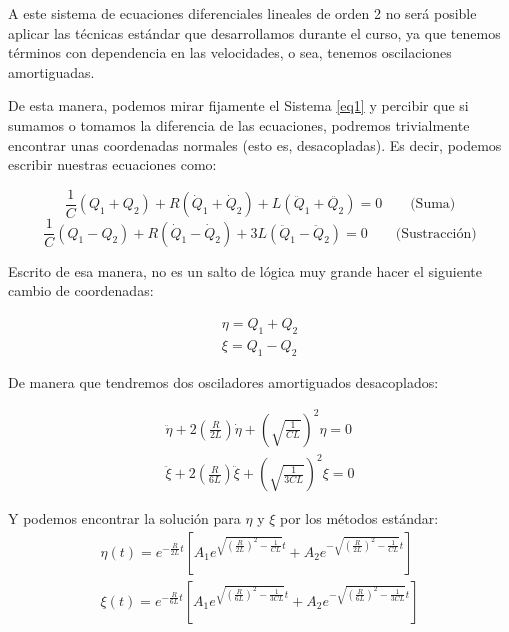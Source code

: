 \documentclass[a4paper,12pt]{article}
\begin{document}
A este sistema de ecuaciones diferenciales lineales de orden 2 no será posible aplicar las técnicas estándar que desarrollamos durante el curso, ya que tenemos términos con dependencia en las velocidades, o sea, tenemos oscilaciones amortiguadas.

De esta manera, podemos mirar fijamente el Sistema \eqref{eq1} y percibir que si sumamos o tomamos la diferencia de las ecuaciones, podremos trivialmente encontrar unas coordenadas normales (esto es, desacopladas). Es decir, podemos escribir nuestras ecuaciones como:

$$ \frac{1}{C} (Q_1 + Q_2) + R (\dot{Q}_1 + \dot{Q}_2)  + L (\ddot{Q}_1 + \ddot{Q_2})=0 \qquad \text{(Suma)}$$
$$\frac{1}{C} (Q_1 - Q_2) + R (\dot{Q}_1 - \dot{Q}_2) + 3L (\ddot{Q}_1 - \ddot{Q}_2) = 0 \qquad \text{(Sustracción)}$$

Escrito de esa manera, no es un salto de lógica muy grande hacer el siguiente cambio de coordenadas:

\begin{equation}
  \begin{aligned}
    \eta = Q_1 + Q_2 \\
    \xi = Q_1 - Q_2 
  \end{aligned} 
\end{equation}

De manera que tendremos dos osciladores amortiguados desacoplados:

\begin{equation}
\label{coords1}
  \begin{aligned}
    \ddot{\eta} + 2\left(\frac{R}{2L}\right) \dot{\eta} + \left(\sqrt{\frac{1}{CL}}\right)^2 \eta = 0 \\
    \ddot{\xi} + 2\left(\frac{R}{6L}\right) \ddot{\xi} + \left(\sqrt{\frac{1}{3CL}}\right)^2 \xi = 0
  \end{aligned}
\end{equation}

Y podemos encontrar la solución para $\eta$ y $\xi$ por los métodos estándar:
\begin{equation}
\label{coords1}
  \begin{aligned}
    \eta(t) = e^{-\frac{R}{2L}t}\left[A_1 e^{\sqrt{\left(\frac{R}{2L}\right)^2 -\frac{1}{CL}}t} + A_2e^{-\sqrt{\left(\frac{R}{2L}\right)^2 -\frac{1}{CL}}t}\right]\\
    \xi(t) = e^{-\frac{R}{6L}t}\left[A_1 e^{\sqrt{\left(\frac{R}{6L}\right)^2 -\frac{1}{3CL}}t} + A_2e^{-\sqrt{\left(\frac{R}{6L}\right)^2 -\frac{1}{3CL}}t}\right]
  \end{aligned}
\end{equation}
\end{document}
